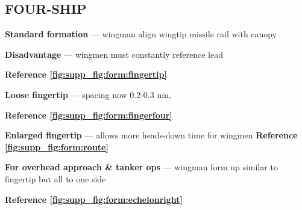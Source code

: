 \subsection{FOUR-SHIP}

\begin{tcoloritemize}
    \blueitem[Fingertip]
    \textbf{Standard formation}
    --- wingman align wingtip missile rail with canopy
    
    \textbf{Disadvantage} --- wingmen must constantly reference lead

    \hfill\textbf{Reference \cref{fig:supp_fig:form:fingertip}}

    \textbf{Loose fingertip} --- spacing now 0.2-0.3 nm,

    \hfill\textbf{Reference \cref{fig:supp_fig:form:fingerfour}}

    \blueitem[Route]
    \textbf{Enlarged fingertip}
    --- allows more heads-down time for wingmen
    \hfill\textbf{Reference \cref{fig:supp_fig:form:route}}

    \textbf{For overhead approach \& tanker ops}
    --- wingman form up similar to fingertip but all to one side

    \hfill\textbf{Reference \cref{fig:supp_fig:form:echelonright}}
\end{tcoloritemize}


